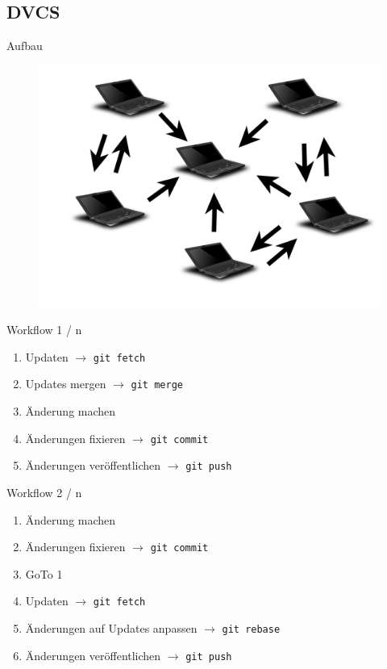 \documentclass[presentation]{beamer}
\begin{document}
\subsection{DVCS}
\begin{frame}{Aufbau}
  \begin{figure}
    \centering
    \includegraphics[width=\textwidth]{img/dvcs}
  \end{figure}
\end{frame}
\begin{frame}{Workflow 1 / n}
  \begin{enumerate}[<+->]
  \item Updaten $\rightarrow$ \texttt{git fetch}
  \item Updates mergen $\rightarrow$ \texttt{git merge}
  \item Änderung machen
  \item Änderungen fixieren $\rightarrow$ \texttt{git commit}
  \item Änderungen veröffentlichen $\rightarrow$ \texttt{git push}
  \end{enumerate}
\end{frame}
\begin{frame}{Workflow 2 / n}
  \begin{enumerate}[<+->]
  \item Änderung machen
  \item Änderungen fixieren $\rightarrow$ \texttt{git commit}
  \item GoTo 1
  \item Updaten $\rightarrow$ \texttt{git fetch}
  \item Änderungen auf Updates anpassen $\rightarrow$ \texttt{git rebase}
  \item Änderungen veröffentlichen $\rightarrow$ \texttt{git push}
  \end{enumerate}
\end{frame}
\end{document}
